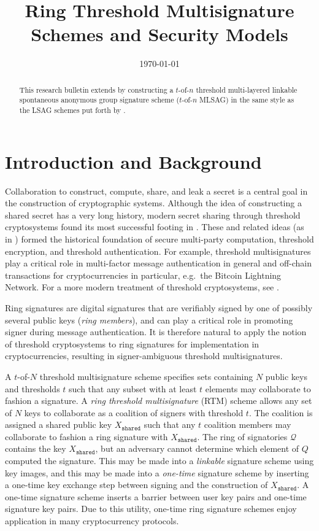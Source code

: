 \documentclass{mrl}
\title{Ring Threshold Multisignature Schemes and Security Models}
\date{\today}
\theoremstyle{definition}
\begin{document}
\begin{abstract}
This research bulletin extends \cite{noether2016ring} by constructing a $t$-of-$n$ threshold multi-layered linkable spontaneous anonymous group signature scheme ($t$-of-$n$ MLSAG) in the same style as the LSAG schemes put forth by \cite{liu2004linkable}. %
\end{abstract}

\section{Introduction and Background}

Collaboration to construct, compute, share, and leak a secret is a central goal in the construction of cryptographic systems. Although the idea of constructing a shared secret has a very long history, modern secret sharing through threshold cryptosystems found its most successful footing in \cite{shamir1979share}. These and related ideas (as in \cite{shamir1981mental}) formed the historical foundation of secure multi-party computation, threshold encryption, and threshold authentication. For example, threshold multisignatures play a critical role in multi-factor message authentication in general and off-chain transactions for cryptocurrencies in particular, e.g.\ the Bitcoin Lightning Network.  For a more modern treatment of threshold cryptosystems, see \cite{bonehthreshold}.

Ring signatures are digital signatures that are verifiably signed by one of possibly several public keys (\textit{ring members}), and can play a critical role in promoting signer during message authentication. It is therefore natural to apply the notion of threshold cryptosystems to ring signatures for implementation in cryptocurrencies, resulting in signer-ambiguous threshold multisignatures. 

A $t$-of-$N$ threshold multisignature scheme specifies sets containing $N$ public keys and thresholds $t$ such that any subset with at least $t$ elements may collaborate to fashion a signature. A \textit{ring threshold multisignature} (RTM) scheme allows any set of $N$ keys to collaborate as a coalition of signers with threshold $t$. The coalition is assigned a shared public key $X_{\texttt{shared}}$ such that any $t$ coalition members may collaborate to fashion a ring signature with $X_{\texttt{shared}}$. The ring of signatories $\mathcal{Q}$ contains the key $X_{\texttt{shared}}$, but an adversary cannot determine which element of $Q$ computed the signature. This may be made into a \textit{linkable} signature scheme using key images, and this may be made into a \textit{one-time} signature scheme by inserting a one-time key exchange step between signing and the construction of $X_{\texttt{shared}}$. A one-time signature scheme inserts a barrier between user key pairs and one-time signature key pairs. Due to this utility, one-time ring signature schemes enjoy application in many cryptocurrency protocols. 
\end{document}
